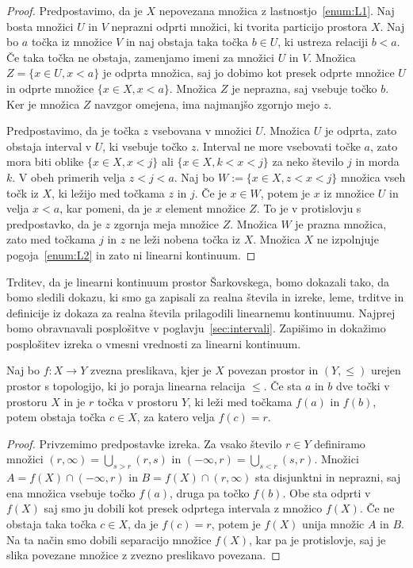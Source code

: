 \documentclass[../TG_magistrsko_delo_sections.tex]{subfiles}
\begin{document}
\begin{proof}
Predpostavimo, da je $X$ nepovezana množica z lastnostjo~\ref{enum:L1}. Naj bosta množici $U$ in $V$ neprazni odprti množici, ki tvorita particijo prostora $X$. Naj bo $a$ točka iz množice $V$ in naj obstaja taka točka $b \in U$, ki ustreza relaciji $b<a$. Če taka točka ne obstaja, zamenjamo imeni za množici $U$ in $V$. Množica $Z = \{x \in U, x<a\}$ je odprta množica, saj jo dobimo kot presek odprte množice $U$ in odprte množice $\{x \in X, x<a\}$. Množica $Z$ je neprazna, saj vsebuje točko $b$. Ker je množica $Z$ navzgor omejena, ima najmanjšo zgornjo mejo $z$.

Predpostavimo, da je točka $z$ vsebovana v množici $U$. Množica $U$ je odprta, zato obstaja interval v $U$, ki vsebuje točko $z$. Interval ne more vsebovati točke $a$, zato mora biti oblike $\{x \in X, x<j\}$ ali $\{x \in X, k<x<j\}$ za neko število $j$ in morda $k$. V obeh primerih velja $z<j<a$. Naj bo $W := \{x \in X, z<x<j\}$ množica vseh točk iz $X$, ki ležijo med točkama $z$ in $j$. Če je $x \in W$, potem je $x$ iz množice $U$ in velja $x<a$, kar pomeni, da je $x$ element množice $Z$. To je v protislovju s predpostavko, da je $z$ zgornja meja množice $Z$. Množica $W$ je prazna množica, zato med točkama $j$ in $z$ ne leži nobena točka iz $X$. Množica $X$ ne izpolnjuje pogoja~\ref{enum:L2} in zato ni linearni kontinuum.
\end{proof}

Trditev, da je linearni kontinuum prostor Šarkovskega, bomo dokazali tako, da bomo sledili dokazu, ki smo ga zapisali za realna števila in izreke, leme, trditve in definicije iz dokaza za realna števila prilagodili linearnemu kontinuumu. Najprej bomo obravnavali posplošitve v poglavju~\ref{sec:intervali}. Zapišimo in dokažimo posplošitev izreka o vmesni vrednosti za linearni kontinuum.

\begin{izrek}
Naj bo $f \colon X \to Y$ zvezna preslikava, kjer je $X$ povezan prostor in $(Y, \leq)$ urejen prostor s topologijo, ki jo poraja linearna relacija $\leq$. Če sta $a$ in $b$ dve točki v prostoru $X$ in je $r$ točka v prostoru $Y$, ki leži med točkama $f(a)$ in $f(b)$, potem obstaja točka $c \in X$, za katero velja $f(c) = r$.
\end{izrek}
\begin{proof}
Privzemimo predpostavke izreka. Za vsako število $r \in Y$ definiramo množici 
$(r, \infty) = \bigcup\limits_{s > r} (r, s)$ in $(-\infty, r) = \bigcup\limits_{s < r} (s, r)$.
Množici $A=f(X) \cap (-\infty, r)$ in $B=f(X) \cap (r, \infty)$ sta disjunktni in neprazni, saj ena množica vsebuje točko $f(a)$, druga pa točko $f(b)$. Obe sta odprti v $f(X)$ saj smo ju dobili kot presek odprtega intervala z množico $f(X)$. Če ne obstaja taka točka $c \in X$, da je $f(c) = r$, potem je $f(X)$ unija množic $A$ in $B$. Na ta način smo dobili separacijo množice $f(X)$, kar pa je protislovje, saj je slika povezane množice z zvezno preslikavo povezana.
\end{proof}
\end{document}
